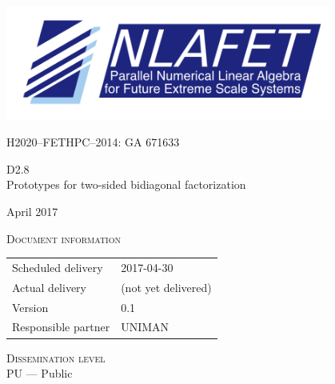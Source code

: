 \documentclass[a4paper,12pt]{article}
\def\nlafetMajor{2}
\def\nlafetMinor{8}
\def\nlafetTitle{Prototypes for two-sided bidiagonal factorization}
\def\nlafetMonth{April}
\def\nlafetYear{2017}
\def\nlafetScheduledDelivery{2017-04-30}
\def\nlafetActualDelivery{(not yet delivered)}
\def\nlafetVersionMajor{0}
\def\nlafetVersionMinor{1}
\def\nlafetResponsiblePartner{UNIMAN}
\def\nlafetDisseminationLevel{PU --- Public}
\begin{document}
\begin{titlepage}
  \centering
  {
    \includegraphics[width=0.8\textwidth]{fig/NLAFET-logo2.png}
  }
  \par
  \vspace{5mm}
  {
    H2020--FETHPC--2014: GA 671633
  }
  \par
  \vspace{4cm}
  {
    \Huge
    D\nlafetMajor.\nlafetMinor\\[1em]
    \nlafetTitle
  }
  \par
  \vfill
  {
    \Large
    \nlafetMonth{}
    \nlafetYear
  }
\end{titlepage}



%

\newpage




\noindent
\textsc{Document information}\\[1em]
\begin{tabular}{@{}ll}
  Scheduled delivery & \nlafetScheduledDelivery \\
  Actual delivery & \nlafetActualDelivery \\
  Version & \nlafetVersionMajor.\nlafetVersionMinor \\
  Responsible partner & \nlafetResponsiblePartner \\
\end{tabular}

\vspace{2em}


\noindent
\textsc{Dissemination level}\\[1em]
\nlafetDisseminationLevel
\end{document}
